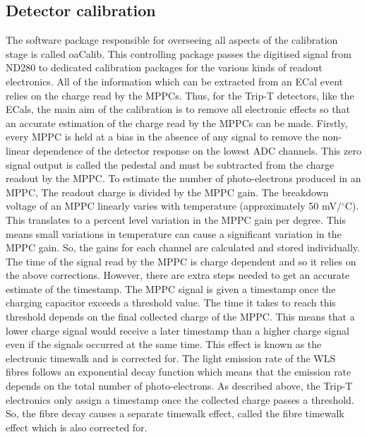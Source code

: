 \subsection{Detector calibration}
\label{subsec:DetectorCalibration}
The software package responsible for overseeing all aspects of the calibration stage is called oaCalib.  This controlling package passes the digitised signal from ND280 to dedicated calibration packages for the various kinds of readout electronics.  All of the information which can be extracted from an ECal event relies on the charge read by the MPPCs.  Thus, for the Trip-T detectors, like the ECals, the main aim of the calibration is to remove all electronic effects so that an accurate estimation of the charge read by the MPPCs can be made.  
\newline
\newline
Firstly, every MPPC is held at a bias in the absence of any signal to remove the non-linear dependence of the detector response on the lowest ADC channels.  This zero signal output is called the pedestal and must be subtracted from the charge readout by the MPPC.  
\newline
\newline
To estimate the number of photo-electrons produced in an MPPC, The readout charge is divided by the MPPC gain.  The breakdown voltage of an MPPC linearly varies with temperature (approximately 50 mV/$^\circ$C).  This translates to a percent level variation in the MPPC gain per degree.  This means small variations in temperature can cause a significant variation in the MPPC gain.  So, the gains for each channel are calculated and stored individually.
\newline
\newline
The time of the signal read by the MPPC is charge dependent and so it relies on the above corrections.  However, there are extra steps needed to get an accurate estimate of the timestamp.  The MPPC signal is given a timestamp once the charging capacitor exceeds a threshold value.  The time it takes to reach this threshold depends on the final collected charge of the MPPC.  This means that a lower charge signal would receive a later timestamp than a higher charge signal even if the signals occurred at the same time.  This effect is known as the electronic timewalk and is corrected for.
\newline
\newline
The light emission rate of the WLS fibres follows an exponential decay function which means that the emission rate depends on the total number of photo-electrons.  As described above, the Trip-T electronics only assign a timestamp once the collected charge passes a threshold.  So, the fibre decay causes a separate timewalk effect, called the fibre timewalk effect which is also corrected for.  
